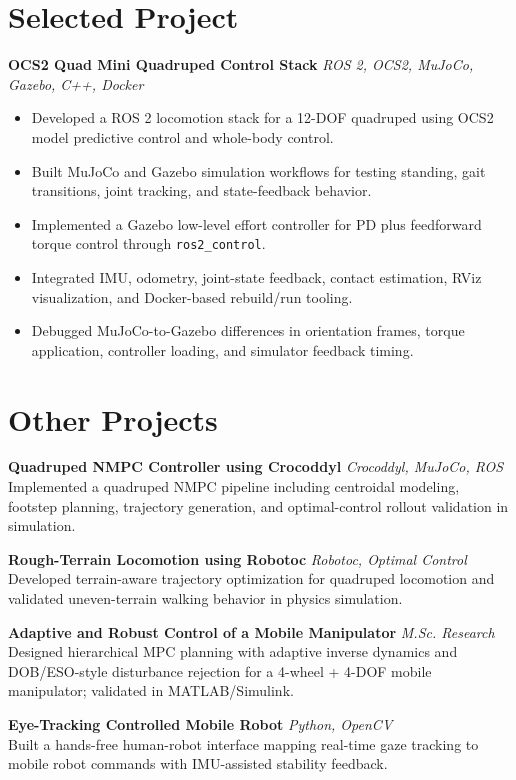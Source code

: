 \documentclass[10pt,a4paper]{article}
\begin{document}
\section*{Selected Project}
\textbf{OCS2 Quad Mini Quadruped Control Stack} \hfill \textit{ROS 2, OCS2, MuJoCo, Gazebo, C++, Docker}
\begin{itemize}
\item Developed a ROS 2 locomotion stack for a 12-DOF quadruped using OCS2 model predictive control and whole-body control.
\item Built MuJoCo and Gazebo simulation workflows for testing standing, gait transitions, joint tracking, and state-feedback behavior.
\item Implemented a Gazebo low-level effort controller for PD plus feedforward torque control through \texttt{ros2\_control}.
\item Integrated IMU, odometry, joint-state feedback, contact estimation, RViz visualization, and Docker-based rebuild/run tooling.
\item Debugged MuJoCo-to-Gazebo differences in orientation frames, torque application, controller loading, and simulator feedback timing.
\end{itemize}

\section*{Other Projects}
\textbf{Quadruped NMPC Controller using Crocoddyl} \hfill \textit{Crocoddyl, MuJoCo, ROS}\\
Implemented a quadruped NMPC pipeline including centroidal modeling, footstep planning, trajectory generation, and optimal-control rollout validation in simulation.

\textbf{Rough-Terrain Locomotion using Robotoc} \hfill \textit{Robotoc, Optimal Control}\\
Developed terrain-aware trajectory optimization for quadruped locomotion and validated uneven-terrain walking behavior in physics simulation.

\textbf{Adaptive and Robust Control of a Mobile Manipulator} \hfill \textit{M.Sc. Research}\\
Designed hierarchical MPC planning with adaptive inverse dynamics and DOB/ESO-style disturbance rejection for a 4-wheel + 4-DOF mobile manipulator; validated in MATLAB/Simulink.

\textbf{Eye-Tracking Controlled Mobile Robot} \hfill \textit{Python, OpenCV}\\
Built a hands-free human-robot interface mapping real-time gaze tracking to mobile robot commands with IMU-assisted stability feedback.
\end{document}
